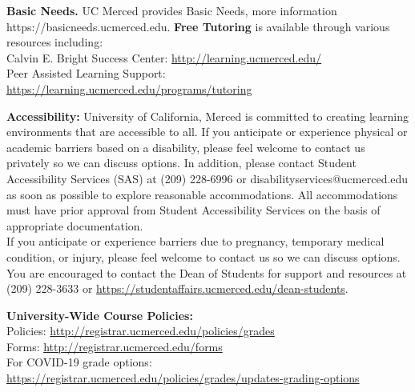 \documentclass{article}
\begin{document}
\textbf{Basic Needs.} UC Merced provides Basic Needs, more information https://basicneeds.ucmerced.edu.
\textbf{Free Tutoring} is available through various resources including: \\
Calvin E. Bright Success Center: \url{http://learning.ucmerced.edu/}  \\ 
Peer Assisted Learning Support: \url{https://learning.ucmerced.edu/programs/tutoring} 

\textbf{Accessibility:} University of California, Merced is committed to creating learning environments that are accessible to all. If you anticipate or experience physical or academic barriers based on a disability, please feel welcome to contact us privately so we can discuss options. In addition, please contact Student Accessibility Services (SAS) at (209) 228-6996 or disabilityservices@ucmerced.edu as soon as possible to explore reasonable accommodations. All accommodations must have prior approval from Student Accessibility Services on the basis of appropriate documentation. \\ 
If you anticipate or experience barriers due to pregnancy, temporary medical condition, or injury, please feel welcome to contact us so we can discuss options. You are encouraged to contact the Dean of Students for support and resources at (209) 228-3633 or \url{https://studentaffairs.ucmerced.edu/dean-students}.%

\textbf{University-Wide Course Policies:} \\ 
Policies:	\url{http://registrar.ucmerced.edu/policies/grades} \\
Forms:	\url{http://registrar.ucmerced.edu/forms} \\
For COVID-19 grade options:\\ \url{https://registrar.ucmerced.edu/policies/grades/updates-grading-options}
 
\end{document}
